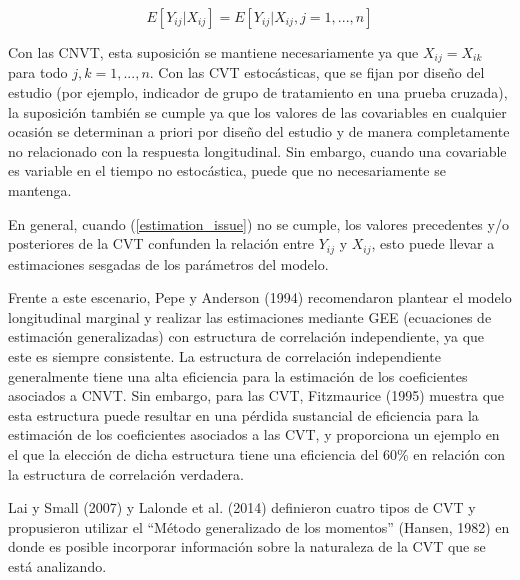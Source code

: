 \documentclass[spanish]{article}
\numberwithin{figure}{subsection}
\numberwithin{equation}{subsection}
\numberwithin{table}{subsection}
\begin{document}

\begin{equation}
\label{estimation_issue}
	E[Y_{ij} | X_{ij}] = E[Y_{ij} | X_{ij}, j = 1, ..., n]
\end{equation}

Con las CNVT, esta suposición se mantiene necesariamente ya que $X_{ij} =
X_{ik}$ para todo $j, k = 1, ..., n$. Con las CVT estocásticas, que se
fijan por diseño del estudio (por ejemplo, indicador de grupo de tratamiento en
una prueba cruzada), la suposición también se cumple ya que los valores de las
covariables en cualquier ocasión se determinan a priori por diseño del estudio y
de manera completamente no relacionado con la respuesta longitudinal. Sin
embargo, cuando una covariable es variable en el tiempo no estocástica, puede
que no necesariamente se mantenga.

En general, cuando (\ref{estimation_issue}) no se cumple, los valores
precedentes y/o posteriores de la CVT confunden la relación entre $Y_{ij}$ y
$X_{ij}$, esto puede llevar a estimaciones sesgadas de los parámetros del
modelo.

Frente a este escenario, Pepe y Anderson (1994) recomendaron plantear el modelo
longitudinal marginal y realizar las estimaciones mediante GEE (ecuaciones de
estimación generalizadas) con estructura de correlación independiente, ya que
este es siempre consistente. La estructura de correlación independiente
generalmente tiene una alta eficiencia para la estimación de los coeficientes
asociados a CNVT. Sin embargo, para las CVT, Fitzmaurice (1995) muestra que esta
estructura puede resultar en una pérdida sustancial de eficiencia para la
estimación de los coeficientes asociados a las CVT, y proporciona un ejemplo en
el que la elección de dicha estructura tiene una eficiencia del 60\% en relación
con la estructura de correlación verdadera.

Lai y Small (2007) y Lalonde et al. (2014) definieron cuatro tipos de CVT y
propusieron utilizar el ``Método generalizado de los momentos'' (Hansen, 1982)
en donde es posible incorporar información sobre la naturaleza de la CVT que se
está analizando.

\end{document}
